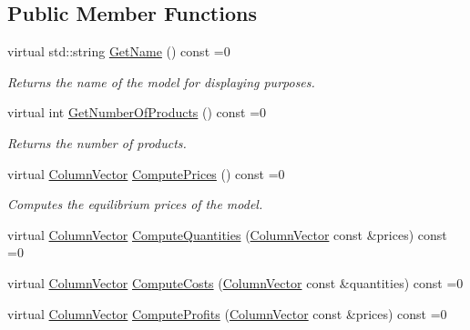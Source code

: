 \subsection*{Public Member Functions}
\begin{DoxyCompactItemize}
\item 
\mbox{\label{classModelInterface_ad2d37b05bed8ef0663a4e75221c31e7d}} 
virtual std\+::string \hyperlink{classModelInterface_ad2d37b05bed8ef0663a4e75221c31e7d}{Get\+Name} () const =0
\begin{DoxyCompactList}\small\item\em Returns the name of the model for displaying purposes. \end{DoxyCompactList}\item 
\mbox{\label{classModelInterface_abb173c60dc16ba8b0e087f8edbbeb5b9}} 
virtual int \hyperlink{classModelInterface_abb173c60dc16ba8b0e087f8edbbeb5b9}{Get\+Number\+Of\+Products} () const =0
\begin{DoxyCompactList}\small\item\em Returns the number of products. \end{DoxyCompactList}\item 
\mbox{\label{classModelInterface_adc2c55b551054c0a98869bc0497919a8}} 
virtual \hyperlink{classColumnVector}{Column\+Vector} \hyperlink{classModelInterface_adc2c55b551054c0a98869bc0497919a8}{Compute\+Prices} () const =0
\begin{DoxyCompactList}\small\item\em Computes the equilibrium prices of the model. \end{DoxyCompactList}\item 
virtual \hyperlink{classColumnVector}{Column\+Vector} \hyperlink{classModelInterface_af9a936f6f0d1b1f0f2c5bf35785e7db4}{Compute\+Quantities} (\hyperlink{classColumnVector}{Column\+Vector} const \&prices) const =0
\item 
virtual \hyperlink{classColumnVector}{Column\+Vector} \hyperlink{classModelInterface_ac0a7cc3db9fc177dc75f16abf00275a7}{Compute\+Costs} (\hyperlink{classColumnVector}{Column\+Vector} const \&quantities) const =0
\item 
virtual \hyperlink{classColumnVector}{Column\+Vector} \hyperlink{classModelInterface_a311a000060cece8fc1058cd27bf07864}{Compute\+Profits} (\hyperlink{classColumnVector}{Column\+Vector} const \&prices) const =0

\end{DoxyCompactItemize}
